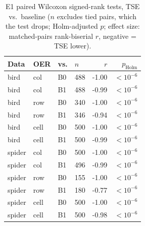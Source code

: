 \begin{table}[t]\centering\caption{E1 paired Wilcoxon signed-rank tests, TSE vs.\ baseline ($n$ excludes tied pairs, which the test drops; Holm-adjusted $p$; effect size: matched-pairs rank-biserial $r$, negative = TSE lower).}\label{tab:e1tests}
\footnotesize\begin{tabular}{llllrr}\hline
\textbf{Data} & \textbf{OER} & \textbf{vs.} & $n$ & $r$ & $p_\mathrm{Holm}$ \\\hline
bird & col & B0 & 488 & -1.00 & $<10^{-6}$ \\
bird & col & B1 & 488 & -0.99 & $<10^{-6}$ \\
bird & row & B0 & 340 & -1.00 & $<10^{-6}$ \\
bird & row & B1 & 346 & -0.94 & $<10^{-6}$ \\
bird & cell & B0 & 500 & -1.00 & $<10^{-6}$ \\
bird & cell & B1 & 500 & -0.99 & $<10^{-6}$ \\
spider & col & B0 & 500 & -1.00 & $<10^{-6}$ \\
spider & col & B1 & 496 & -0.99 & $<10^{-6}$ \\
spider & row & B0 & 155 & -1.00 & $<10^{-6}$ \\
spider & row & B1 & 180 & -0.77 & $<10^{-6}$ \\
spider & cell & B0 & 500 & -1.00 & $<10^{-6}$ \\
spider & cell & B1 & 500 & -0.98 & $<10^{-6}$ \\
\hline\end{tabular}\end{table}
